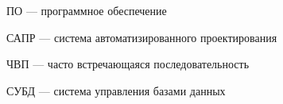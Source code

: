 

\noindent ПО --- программное обеспечение

\noindent САПР --- система автоматизированного проектирования


\noindent ЧВП --- часто встречающаяся последовательность

\noindent СУБД --- система управления базами данных